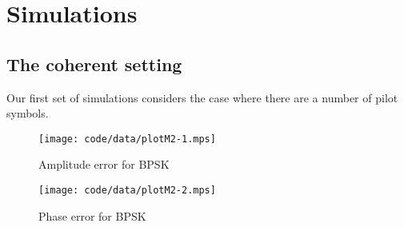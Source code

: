 \documentclass[a4paper,10pt]{article}
\begin{document}

\section{Simulations}\label{sec:simulations}

\subsection{The coherent setting}

Our first set of simulations considers the case where there are a number of pilot symbols.

\begin{figure*}[tp]
	\centering
		\texttt{[image: code/data/plotM2-1.mps]}
		\caption{Amplitude error for BPSK}
		\label{fig:plotamp}
\end{figure*}


\begin{figure*}[tp]
	\centering
		\texttt{[image: code/data/plotM2-2.mps]}
		\caption{Phase error for BPSK}
		\label{fig:plotphase}
\end{figure*}

\end{document}
